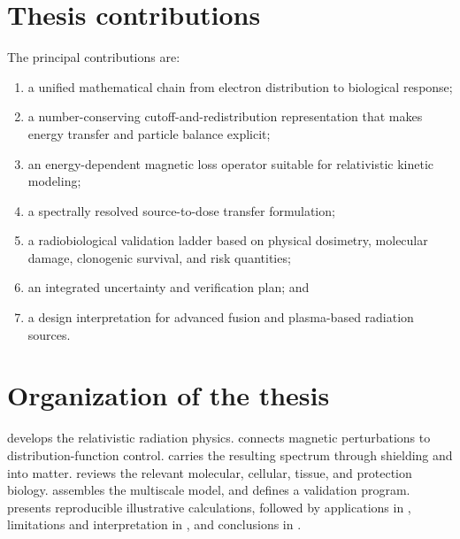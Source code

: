 \section{Thesis contributions}

The principal contributions are:
\begin{enumerate}
\item a unified mathematical chain from electron distribution to biological response;
\item a number-conserving cutoff-and-redistribution representation that makes energy transfer and particle balance explicit;
\item an energy-dependent magnetic loss operator suitable for relativistic kinetic modeling;
\item a spectrally resolved source-to-dose transfer formulation;
\item a radiobiological validation ladder based on physical dosimetry, molecular damage, clonogenic survival, and risk quantities;
\item an integrated uncertainty and verification plan; and
\item a design interpretation for advanced fusion and plasma-based radiation sources.
\end{enumerate}

\section{Organization of the thesis}

 develops the relativistic radiation physics.  connects magnetic perturbations to distribution-function control.  carries the resulting spectrum through shielding and into matter.  reviews the relevant molecular, cellular, tissue, and protection biology.  assembles the multiscale model, and  defines a validation program.  presents reproducible illustrative calculations, followed by applications in , limitations and interpretation in , and conclusions in .

